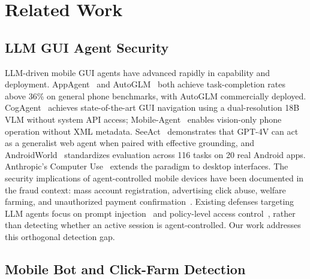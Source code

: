\section{Related Work}
\label{sec:related}

\subsection{LLM GUI Agent Security}
\label{sec:rw_agents}

LLM-driven mobile GUI agents have advanced rapidly in capability and deployment.%
AppAgent~\cite{appagent2024} and AutoGLM~\cite{autoglm2024} both achieve
task-completion rates above 36\% on general phone benchmarks, with AutoGLM commercially
deployed.%
CogAgent~\cite{cogagent2024} achieves state-of-the-art GUI navigation using a
dual-resolution 18B VLM without system API access; Mobile-Agent~\cite{mobileagent2024}
enables vision-only phone operation without XML metadata.%
SeeAct~\cite{seeact2024} demonstrates that GPT-4V can act as a generalist web agent when
paired with effective grounding, and AndroidWorld~\cite{androidworld2024} standardizes
evaluation across 116 tasks on 20 real Android apps.%
Anthropic's Computer Use~\cite{anthropiccu2024} extends the paradigm to desktop interfaces.%
The security implications of agent-controlled mobile devices have been documented in the
fraud context: mass account registration, advertising click abuse, welfare farming, and
unauthorized payment confirmation~\cite{llmagentfraud2025,clickfraud2021,adffraud2021}.%
Existing defenses targeting LLM agents focus on prompt injection~\cite{agentinjection2024}
and policy-level access control~\cite{agentpolicy2024}, rather than detecting whether
an active session is agent-controlled.%
Our work addresses this orthogonal detection gap.%

\subsection{Mobile Bot and Click-Farm Detection}
\label{sec:rw_bot}

